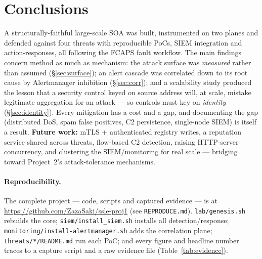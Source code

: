 \documentclass[11pt,a4paper]{article}
\newcommand{\code}[1]{\texttt{\small #1}}
\begin{document}
\section{Conclusions}
A structurally-faithful large-scale SOA was built, instrumented on two planes and defended against
four threats with reproducible PoCs, SIEM integration and action-responses, all following the FCAPS
fault workflow. The main findings concern method as much as mechanism: the attack surface was
\emph{measured} rather than assumed (\S\ref{sec:surface}); an alert cascade was correlated down to its
root cause by Alertmanager inhibition (\S\ref{sec:corr}); and a scalability study produced the lesson
that a security control keyed on source address will, at scale, mistake legitimate aggregation for an
attack --- so controls must key on \emph{identity} (\S\ref{sec:identity}). Every mitigation has a cost
and a gap, and documenting the gap (distributed DoS, spam false positives, C2 persistence, single-node
SIEM) is itself a result. \textbf{Future work:} mTLS + authenticated registry writes, a reputation
service shared across threats, flow-based C2 detection, raising HTTP-server concurrency, and
clustering the SIEM/monitoring for real scale --- bridging toward Project~2's attack-tolerance
mechanisms.

\paragraph{Reproducibility.}
The complete project --- code, scripts and captured evidence --- is at
\url{https://github.com/ZazaSaki/ssle-proj1} (see \code{REPRODUCE.md}).
\code{lab/genesis.sh} rebuilds the core; \code{siem/install\_siem.sh} installs all
detection/response; \code{monitoring/install-alertmanager.sh} adds the correlation plane;
\code{threats/*/README.md} run each PoC; and every figure and headline number traces to a capture
script and a raw evidence file (Table~\ref{tab:evidence}).
\end{document}
